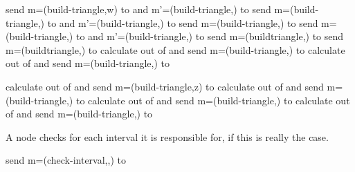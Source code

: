 \documentclass[11pt]{article}
\begin{document}
\begin{algorithm}
\begin{algorithmic}

\If{} 
\ForAll{}
\State 
\State send m=(build-triangle,w) to  and  m'=(build-triangle,) to 
\EndFor
\ForAll{}
\State 
\State send m=(build-triangle,) to  and  m'=(build-triangle,) to 
\EndFor
\ForAll{}
\State send m=(build-triangle,) to 
\EndFor
\State send m=(build-triangle,) to  and  m'=(build-triangle,) to 
\Else {}
\If{}
\State send m=(buildtriangle,) to 
\State 
\ElsIf{}
\State send m=(buildtriangle,) to 
\State 
\ElsIf {}
\State calculate  out of  and 
\ForAll{}
\State 
\State send m=(build-triangle,) to 
\EndFor
\State 
\ElsIf {}
\State calculate  out of  and 
\ForAll{}
\State 
\State send m=(build-triangle,) to 
\EndFor
\State 
\EndIf
\EndIf
\EndFunction
\end{algorithmic}
\end{algorithm}

\begin{algorithm}

\begin{algorithmic}
\State  {}
\State  {}
\State  {}
\State  {}
\State calculate  out of  and  
\State 
\If{}
\ForAll{}
\State send m=(build-triangle,z) to 
\EndFor
\State 
\EndIf
\State calculate  out of  and 
\State 
\If {}
\ForAll{}
\State send m=(build-triangle,) to 
\EndFor
\State 
\EndIf
\State calculate  out of  and 
\ForAll{}
\State 
\State send m=(build-triangle,) to 
\EndFor
\State 
\State calculate  out of  and 
\ForAll{}
\State 
\State send m=(build-triangle,) to 
\EndFor
\State 
\EndFunction
\end{algorithmic}
\end{algorithm}




\begin{algorithm}
A node checks for each interval it is responsible for, if this is really the case.

\begin{algorithmic}
\State send m=(check-interval,,) to 
\EndFor
\EndFunction
\end{algorithmic}
\end{algorithm}
\end{document}
